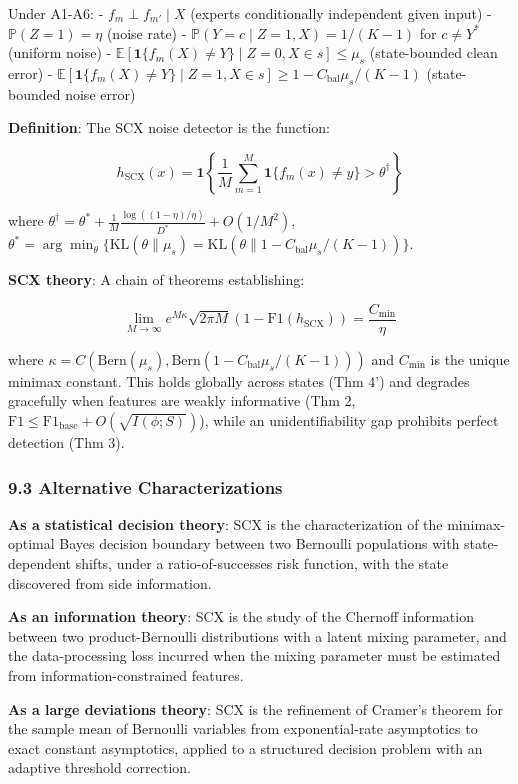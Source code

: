 \documentclass[
  12pt,
]{article}
\begin{document}
Under A1-A6: - \(f_m \perp f_{m'} \mid X\) (experts conditionally
independent given input) - \(\mathbb{P}(Z=1) = \eta\) (noise rate) -
\(\mathbb{P}(Y = c \mid Z=1, X) = 1/(K-1)\) for \(c \neq Y^*\) (uniform
noise) -
\(\mathbb{E}[\mathbf{1}\{f_m(X) \neq Y\} \mid Z=0, X \in s] \leq \mu_s\)
(state-bounded clean error) -
\(\mathbb{E}[\mathbf{1}\{f_m(X) \neq Y\} \mid Z=1, X \in s] \geq 1 - C_{\text{bal}}\mu_s/(K-1)\)
(state-bounded noise error)

\textbf{Definition}: The SCX noise detector is the function:

\[h_{\text{SCX}}(x) = \mathbf{1}\left\{\frac{1}{M}\sum_{m=1}^M \mathbf{1}\{f_m(x) \neq y\} > \theta^\dagger\right\}\]

where
\(\theta^\dagger = \theta^* + \frac{1}{M}\frac{\log((1-\eta)/\eta)}{D^*} + O(1/M^2)\),
\(\theta^* = \arg\min_\theta \{\text{KL}(\theta\|\mu_s) = \text{KL}(\theta\|1 - C_{\text{bal}}\mu_s/(K-1))\}\).

\textbf{SCX theory}: A chain of theorems establishing:

\[\lim_{M\to\infty} e^{M\kappa}\sqrt{2\pi M}(1 - \text{F1}(h_{\text{SCX}})) = \frac{C_{\min}}{\eta}\]

where
\(\kappa = C(\text{Bern}(\mu_s), \text{Bern}(1 - C_{\text{bal}}\mu_s/(K-1)))\)
and \(C_{\min}\) is the unique minimax constant. This holds globally
across states (Thm 4') and degrades gracefully when features are weakly
informative (Thm 2,
\(\text{F1} \leq \text{F1}_{\text{base}} + O(\sqrt{I(\phi;S)})\)), while
an unidentifiability gap prohibits perfect detection (Thm 3).

\subsubsection{9.3 Alternative
Characterizations}\label{alternative-characterizations}

\textbf{As a statistical decision theory}: SCX is the characterization
of the minimax-optimal Bayes decision boundary between two Bernoulli
populations with state-dependent shifts, under a ratio-of-successes risk
function, with the state discovered from side information.

\textbf{As an information theory}: SCX is the study of the Chernoff
information between two product-Bernoulli distributions with a latent
mixing parameter, and the data-processing loss incurred when the mixing
parameter must be estimated from information-constrained features.

\textbf{As a large deviations theory}: SCX is the refinement of Cramer's
theorem for the sample mean of Bernoulli variables from exponential-rate
asymptotics to exact constant asymptotics, applied to a structured
decision problem with an adaptive threshold correction.
\end{document}
